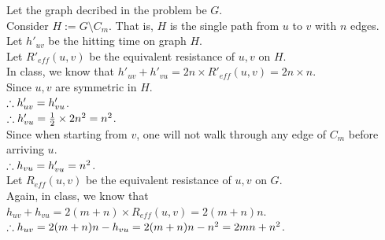 \begin{pr}
Let the graph decribed in the problem be $G$.\\
Consider $H:=G\setminus C_m$. That is, $H$ is the single path from $u$ to $v$ with $n$ edges.\\
Let $h'_{uv}$ be the hitting time on graph $H$.\\
Let $R'_{eff}(u, v)$ be the equivalent resistance of $u, v$ on $H$.\\
In class, we know that $h'_{uv}+h'_{vu}=2n\times R'_{eff}(u, v)=2n\times n$.\\
Since $u, v$ are symmetric in $H$.\\
$\therefore h'_{uv}=h'_{vu}$.\\
$\therefore h'_{vu}=\frac12\times2n^2=n^2$.\\
Since when starting from $v$, one will not walk through any edge of $C_m$ before arriving $u$.\\
$\therefore h_{vu}=h'_{vu}=n^2$.\\
Let $R_{eff}(u, v)$ be the equivalent resistance of $u, v$ on $G$.\\
Again, in class, we know that $h_{uv}+h_{vu}=2(m+n)\times R_{eff}(u, v)=2(m+n)n$.\\
$\therefore h_{uv}=2(m+n)n-h_{vu}=2(m+n)n-n^2=2mn+n^2$.
\end{pr}

